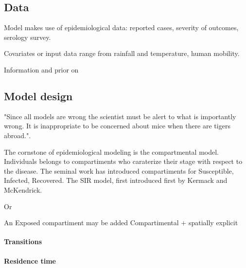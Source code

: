 \subsection{Data}
Model makes use of epidemiological data: reported cases, severity of outcomes, serology survey. 

Covariates or input data range from rainfall and temperature, human mobility.

Information and prior on



\subsection{Model design}

"Since all models are wrong the scientist must be alert to what is importantly wrong. It is inappropriate to be concerned about mice when there are tigers abroad."\cite{Box:ScienceStatistics:1976}.

The cornstone of epidemiological modeling is the compartmental model. Individuals belongs to compartiments who caraterize their stage with respect to the disease. The seminal work has introduced compartiments for Susceptible, Infected, Recovered. The SIR model, first introduced first by Kermack and McKendrick\cite{Kermack:ContributionMathematicalTheory:1927}. 

Or

An Exposed compartiment may be added 
Compartimental + spatially explicit

\paragraph{Transitions}



\paragraph{Residence time}

\cite{Hurtado:GeneralizationsLinearChain:2019}


